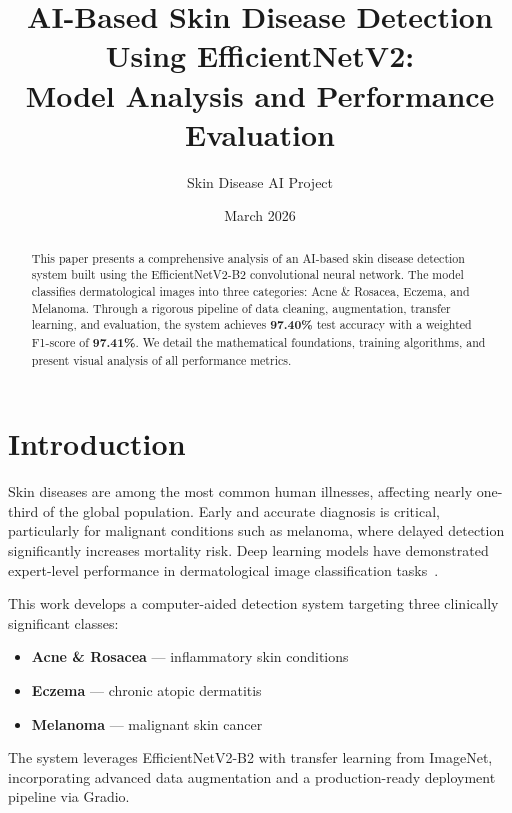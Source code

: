 \documentclass[10pt,a4paper,twocolumn]{article}
\title{\textbf{AI-Based Skin Disease Detection Using EfficientNetV2:\\Model Analysis and Performance Evaluation}}
\author{Skin Disease AI Project}
\date{March 2026}
\begin{document}
\maketitle

\begin{abstract}
\noindent This paper presents a comprehensive analysis of an AI-based skin disease detection system built using the EfficientNetV2-B2 convolutional neural network. The model classifies dermatological images into three categories: Acne \& Rosacea, Eczema, and Melanoma. Through a rigorous pipeline of data cleaning, augmentation, transfer learning, and evaluation, the system achieves \textbf{97.40\%} test accuracy with a weighted F1-score of \textbf{97.41\%}. We detail the mathematical foundations, training algorithms, and present visual analysis of all performance metrics.
\end{abstract}

\section{Introduction}

Skin diseases are among the most common human illnesses, affecting nearly one-third of the global population. Early and accurate diagnosis is critical, particularly for malignant conditions such as melanoma, where delayed detection significantly increases mortality risk. Deep learning models have demonstrated expert-level performance in dermatological image classification tasks~.

This work develops a computer-aided detection system targeting three clinically significant classes:
\begin{itemize}
\item \textbf{Acne \& Rosacea} --- inflammatory skin conditions
\item \textbf{Eczema} --- chronic atopic dermatitis
\item \textbf{Melanoma} --- malignant skin cancer
\end{itemize}

The system leverages EfficientNetV2-B2 with transfer learning from ImageNet, incorporating advanced data augmentation and a production-ready deployment pipeline via Gradio.
\end{document}
